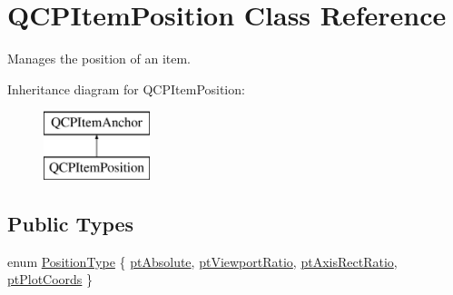 \hypertarget{classQCPItemPosition}{}\section{Q\+C\+P\+Item\+Position Class Reference}
\label{classQCPItemPosition}


Manages the position of an item.  


Inheritance diagram for Q\+C\+P\+Item\+Position\+:\begin{figure}[H]
\begin{center}
\leavevmode
\includegraphics[height=2.000000cm]{classQCPItemPosition}
\end{center}
\end{figure}
\subsection*{Public Types}
\begin{DoxyCompactItemize}
\item 
enum \hyperlink{classQCPItemPosition_aad9936c22bf43e3d358552f6e86dbdc8}{Position\+Type} \{ \hyperlink{classQCPItemPosition_aad9936c22bf43e3d358552f6e86dbdc8a564f5e53e550ead1ec5fc7fc7d0b73e0}{pt\+Absolute}, 
\hyperlink{classQCPItemPosition_aad9936c22bf43e3d358552f6e86dbdc8ac7d6aa89ceacb39658b0d6da061c789a}{pt\+Viewport\+Ratio}, 
\hyperlink{classQCPItemPosition_aad9936c22bf43e3d358552f6e86dbdc8a01080fd00eaf09fa238ef6b73bbfef75}{pt\+Axis\+Rect\+Ratio}, 
\hyperlink{classQCPItemPosition_aad9936c22bf43e3d358552f6e86dbdc8ad5ffb8dc99ad73263f7010c77342294c}{pt\+Plot\+Coords}
 \}
\end{DoxyCompactItemize}
